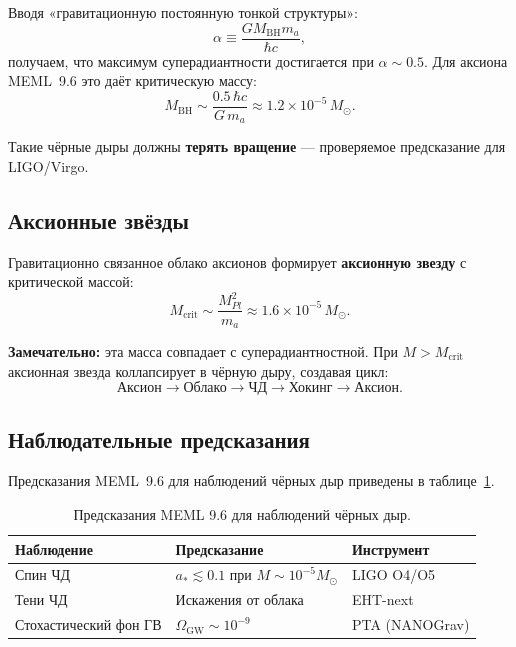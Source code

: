 \documentclass[12pt,a4paper]{article}
\begin{document}
Вводя «гравитационную постоянную тонкой структуры»:
\begin{equation}
\alpha \equiv \frac{G M_{\text{BH}} m_a}{\hbar c},
\end{equation}
получаем, что максимум суперадиантности достигается при $\alpha \sim 0.5$. Для аксиона MEML~9.6 это даёт критическую массу:
\begin{equation}
\boxed{\; M_{\text{BH}} \sim \frac{0.5\,\hbar c}{G\,m_a}
\approx 1.2 \times 10^{-5}\,M_\odot. \;}
\end{equation}

Такие чёрные дыры должны \textbf{терять вращение} --- проверяемое предсказание для LIGO/Virgo.

\subsection{Аксионные звёзды}
\label{subsec:axion-stars}

Гравитационно связанное облако аксионов формирует \textbf{аксионную звезду} с критической массой:
\begin{equation}
M_{\text{crit}} \sim \frac{M_{Pl}^2}{m_a}
\approx 1.6 \times 10^{-5}\,M_\odot.
\end{equation}

\textbf{Замечательно:} эта масса совпадает с суперадиантностной. При $M > M_{\text{crit}}$ аксионная звезда коллапсирует в чёрную дыру, создавая цикл:
\begin{equation}
\text{Аксион} \to \text{Облако} \to \text{ЧД}
\to \text{Хокинг} \to \text{Аксион}.
\end{equation}

\subsection{Наблюдательные предсказания}
\label{subsec:bh-predictions}

Предсказания MEML~9.6 для наблюдений чёрных дыр приведены в таблице~\ref{tab:bh-predictions}.

\begin{table}[H]
\centering
\small
\caption{Предсказания MEML 9.6 для наблюдений чёрных дыр.}
\label{tab:bh-predictions}
\begin{tabular}{@{}p{3.5cm}p{4cm}p{4cm}@{}}
\toprule
\textbf{Наблюдение} & \textbf{Предсказание} & \textbf{Инструмент} \\
\midrule
Спин ЧД & $a_* \lesssim 0.1$ при $M \sim 10^{-5} M_\odot$ & LIGO O4/O5 \\
Тени ЧД & Искажения от облака & EHT-next \\
Стохастический фон ГВ & $\Omega_{\text{GW}} \sim 10^{-9}$ & PTA (NANOGrav) \\
\bottomrule
\end{tabular}
\end{table}
\end{document}
